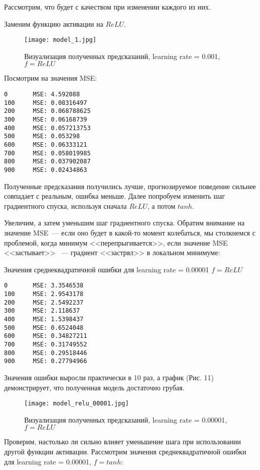 \documentclass[12pt, a4paper]{article}
\begin{document}
Рассмотрим, что будет с качеством при изменении каждого из них.

Заменим функцию активации на $ReLU$.

\begin{figure}[ht]
	\noindent\centering
	\texttt{[image: model\_1.jpg]}
	\caption{Визуализация полученных предсказаний, learning rate = 0.001, $f = ReLU$}
\end{figure}

Посмотрим на значения MSE:

\begin{verbatim}
0   	MSE: 4.592088
100 	MSE: 0.08316497
200 	MSE: 0.068788625
300 	MSE: 0.06168739
400 	MSE: 0.057213753
500 	MSE: 0.053298
600 	MSE: 0.06333121
700 	MSE: 0.058019985
800 	MSE: 0.037902087
900 	MSE: 0.02434863
\end{verbatim}

Полученные предсказания получились лучше, прогнозируемое поведение сильнее совпадает с реальным, ошибка меньше. Далее попробуем изменить шаг градиентного спуска, используя сначала $ReLU$, а потом $tanh$.

Увеличим, а затем уменьшим шаг градиентного спуска. Обратим внимание на значение MSE~--- если оно будет в какой-то момент колебаться, мы столкнемся с проблемой, когда минимум <<перепрыгивается>>, если значение MSE  <<застывает>> ~---  градиент  <<застрял>> в локальном минимуме:

Значения среднеквадратичной ошибки для learning rate = 0.00001  $f = ReLU$

\begin{verbatim}
0   	MSE: 3.3546538
100 	MSE: 2.9543178
200 	MSE: 2.5492237
300 	MSE: 2.118637
400 	MSE: 1.5398437
500 	MSE: 0.6524048
600 	MSE: 0.34827211
700 	MSE: 0.31749552
800 	MSE: 0.29518446
900 	MSE: 0.27794966
\end{verbatim}

Значения ошибки выросли практически в 10 раз, а график (Рис. 11) демонстрирует, что полученная модель достаточно грубая.

\begin{figure}[ht]
	\noindent\centering
	\texttt{[image: model\_relu\_00001.jpg]}
	\caption{Визуализация полученных предсказаний, learning rate = 0.00001, $f = ReLU$}
\end{figure}

Проверим, настолько ли сильно влияет уменьшение шага при использовании другой функции активации.
Рассмотрим значения среднеквадратичной ошибки для learning rate = 0.00001, $f = tanh$:
\end{document}
